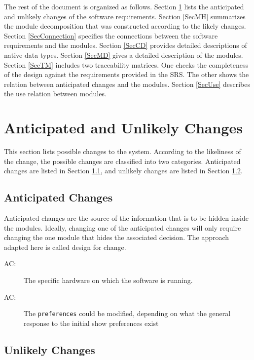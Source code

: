 \documentclass[12pt, titlepage]{article}
\newcounter{acnum}
\newcommand{\actheacnum}{AC\theacnum}
\begin{document}
The rest of the document is organized as follows. Section
\ref{SecChange} lists the anticipated and unlikely changes of the software
requirements. Section \ref{SecMH} summarizes the module decomposition that
was constructed according to the likely changes. Section \ref{SecConnection}
specifies the connections between the software requirements and the
modules. Section \ref{SecCD} provides detailed descriptions of native data types. Section \ref{SecMD} gives a detailed description of the
modules. Section \ref{SecTM} includes two traceability matrices. One checks
the completeness of the design against the requirements provided in the SRS. The
other shows the relation between anticipated changes and the modules. Section
\ref{SecUse} describes the use relation between modules.

\section{Anticipated and Unlikely Changes} \label{SecChange}

This section lists possible changes to the system. According to the likeliness
of the change, the possible changes are classified into two
categories. Anticipated changes are listed in Section \ref{SecAchange}, and
unlikely changes are listed in Section \ref{SecUchange}.

\subsection{Anticipated Changes} \label{SecAchange}

Anticipated changes are the source of the information that is to be hidden
inside the modules. Ideally, changing one of the anticipated changes will only
require changing the one module that hides the associated decision. The approach
adapted here is called design for
change.

\begin{description}
\item[ \actheacnum \label{acHardware}:] The specific hardware on which the software is running.
\item[ \actheacnum \label{acPrefs}:] The \verb_preferences_ could be modified, depending on what the general response to the initial show preferences exist
\end{description}

\subsection{Unlikely Changes} \label{SecUchange}
\end{document}
